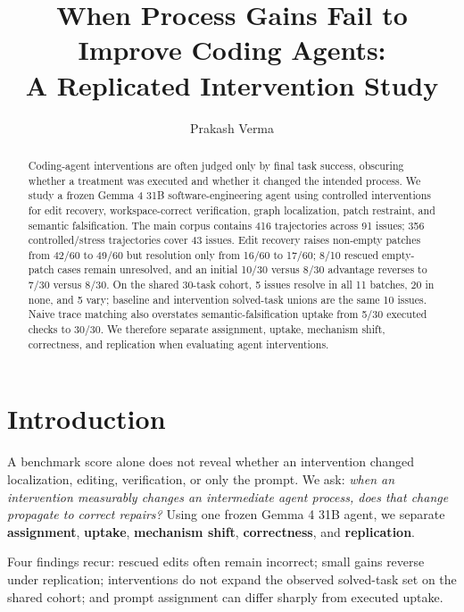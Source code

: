 \documentclass[10pt,twocolumn]{article}
\title{\vspace{-1.3em}\textbf{When Process Gains Fail to Improve Coding Agents:\\A Replicated Intervention Study}}
\author{Prakash Verma}
\date{}
\begin{document}
\maketitle
\vspace{-1.5em}

\begin{abstract}
Coding-agent interventions are often judged only by final task success, obscuring whether a treatment was executed and whether it changed the intended process. We study a frozen Gemma 4 31B software-engineering agent using controlled interventions for edit recovery, workspace-correct verification, graph localization, patch restraint, and semantic falsification. The main corpus contains 416 trajectories across 91 issues; 356 controlled/stress trajectories cover 43 issues. Edit recovery raises non-empty patches from 42/60 to 49/60 but resolution only from 16/60 to 17/60; 8/10 rescued empty-patch cases remain unresolved, and an initial 10/30 versus 8/30 advantage reverses to 7/30 versus 8/30. On the shared 30-task cohort, 5 issues resolve in all 11 batches, 20 in none, and 5 vary; baseline and intervention solved-task unions are the same 10 issues. Naive trace matching also overstates semantic-falsification uptake from 5/30 executed checks to 30/30. We therefore separate assignment, uptake, mechanism shift, correctness, and replication when evaluating agent interventions.
\end{abstract}

\section{Introduction}
A benchmark score alone does not reveal whether an intervention changed localization, editing, verification, or only the prompt. We ask: \emph{when an intervention measurably changes an intermediate agent process, does that change propagate to correct repairs?} Using one frozen Gemma 4 31B agent, we separate \textbf{assignment}, \textbf{uptake}, \textbf{mechanism shift}, \textbf{correctness}, and \textbf{replication}.

Four findings recur: rescued edits often remain incorrect; small gains reverse under replication; interventions do not expand the observed solved-task set on the shared cohort; and prompt assignment can differ sharply from executed uptake.
\end{document}
